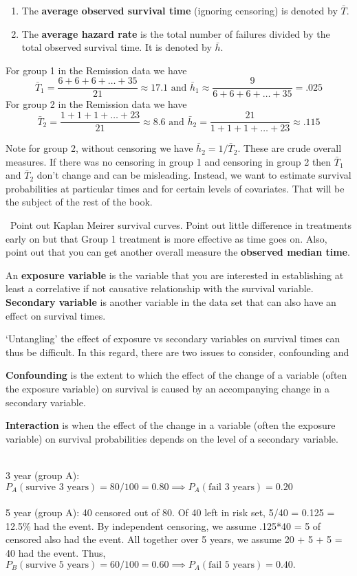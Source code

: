 \documentclass{article}
\begin{document}
\begin{enumerate}
\item The \textbf{average observed survival time }(ignoring censoring) is denoted by $\bar{T}$.
\item The \textbf{average hazard rate} is the total number of failures divided by the total observed survival time. It is denoted by $\bar{h}$.
\end{enumerate}
 For group 1 in the Remission data we have
\[ \bar{T}_1 = \frac{6 + 6 + 6 + \ldots + 35}{21} \approx 17.1 \text { and } \bar{h}_1 \approx \frac{9}{6 + 6 + 6 + \ldots + 35} = .025
\]
For group 2 in the Remission data we have
\[ \bar{T}_2 = \frac{1 + 1 + 1 + \ldots + 23}{21} \approx 8.6 \text { and } \bar{h}_2 = \frac{21}{1 + 1 + 1 + \ldots + 23} \approx .115
\]

Note for group 2, without censoring we have $\bar{h}_2 = 1/\bar{T}_2$. These are crude overall measures. If there was no censoring in group 1 and censoring in group 2 then $\bar{T}_1$ and $\bar{T}_2$ don't change and can be misleading. Instead, we want to estimate survival probabilities at particular times and for certain levels of covariates. That will be the subject of the rest of the book.


\NTS \, Point out Kaplan Meirer survival curves. Point out little difference in treatments early on but that Group 1 treatment is more effective as time goes on. Also, point out that you can get another overall measure the \textbf{observed median time}.

 An \textbf{exposure variable} is the variable that you are interested in establishing at least a correlative if not causative relationship with the survival variable. \textbf{Secondary variable} is another variable in the data set that can also have an effect on survival times.

 `Untangling' the effect of exposure vs secondary variables on survival times can thus be difficult. In this regard, there are two issues to consider, confounding and

 \textbf{Confounding } is the extent to which the effect of the change of a variable (often the exposure variable) on survival is caused by an accompanying change in a secondary variable.

 \textbf{Interaction} is when the effect of the change in a variable (often the exposure variable) on survival probabilities depends on the level of a secondary variable.


 \\
3 year (group A): $P_A(\text{survive 3 years})= 80/100 = 0.80 \implies P_A(\text{fail 3 years}) = 0.20$ \\ \\
5 year (group A): 40 censored out of 80. Of 40 left in risk set, 5/40 = 0.125 = 12.5\% had the event. By independent censoring, we assume .125*40 = 5 of censored also had the event. All together over 5 years, we assume 20 + 5 + 5 = 40 had the event. Thus, $P_B(\text{survive 5 years})= 60/100 = 0.60 \implies P_A(\text{fail 5 years}) = 0.40.$ \\
\end{document}
